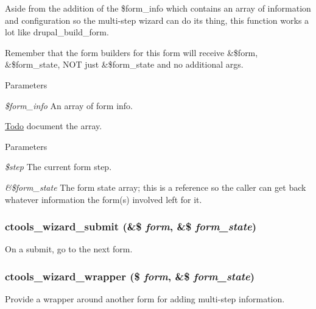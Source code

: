 Aside from the addition of the \$form\_\-info which contains an array of information and configuration so the multi-\/step wizard can do its thing, this function works a lot like drupal\_\-build\_\-form.

Remember that the form builders for this form will receive \&\$form, \&\$form\_\-state, NOT just \&\$form\_\-state and no additional args.


\begin{DoxyParams}{Parameters}
\item[{\em \$form\_\-info}]An array of form info. \end{DoxyParams}
\begin{Desc}
\item[\hyperlink{todo__todo000036}{Todo}]document the array. \end{Desc}

\begin{DoxyParams}{Parameters}
\item[{\em \$step}]The current form step. \item[{\em \&\$form\_\-state}]The form state array; this is a reference so the caller can get back whatever information the form(s) involved left for it. \end{DoxyParams}
\hypertarget{wizard_8inc_a29fd9e85f0e0e87557a80b3b960a61d1}{
\subsubsection[{ctools\_\-wizard\_\-submit}]{\setlength{\rightskip}{0pt plus 5cm}ctools\_\-wizard\_\-submit (\&\$ {\em form}, \/  \&\$ {\em form\_\-state})}}
\label{wizard_8inc_a29fd9e85f0e0e87557a80b3b960a61d1}
On a submit, go to the next form. \hypertarget{wizard_8inc_a2373e7bfdb5d0ad17fcbe1802606dd46}{
\subsubsection[{ctools\_\-wizard\_\-wrapper}]{\setlength{\rightskip}{0pt plus 5cm}ctools\_\-wizard\_\-wrapper (\$ {\em form}, \/  \&\$ {\em form\_\-state})}}
\label{wizard_8inc_a2373e7bfdb5d0ad17fcbe1802606dd46}
Provide a wrapper around another form for adding multi-\/step information. 